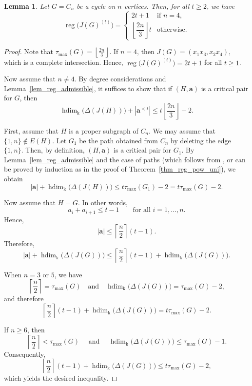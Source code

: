 \documentclass[12pt,amscd]{amsart}
\newtheorem{lem}[thm]{Lemma}
\theoremstyle{definition}
\DeclareMathOperator{\hdim}{hdim}
\DeclareMathOperator{\reg}{reg}
\def\a {\mathbf a}
\def\k {\mathrm k}
\begin{document}
\begin{lem}\label{lem_pow_cycles}
Let $G = C_n$ be a cycle on $n$ vertices. Then, for all $t \ge 2$, we have
\[
\reg\bigl(J(G)^{(t)}\bigr)
=
\begin{cases}
2t + 1 & \text{if } n = 4,\\
\left\lfloor \dfrac{2n}{3} \right\rfloor t & \text{otherwise}.
\end{cases}
\]
\end{lem}

\begin{proof}
Note that
\(\tau_{\max}(G) = \left\lfloor \frac{2n}{3} \right\rfloor.
\) If $n = 4$, then
\(J(G) = (x_1x_3, x_2x_4),
\) which is a complete intersection. Hence,
\(\reg\bigl(J(G)^{(t)}\bigr) = 2t + 1
\) for all $t \ge 1$.

Now assume that $n \neq 4$. By degree considerations and Lemma~\ref{lem_reg_admissible}, it suffices to show that if $(H,\a)$ is a critical pair for $G$, then
\[
\hdim_{\k}\bigl(\Delta(J(H))\bigr) + |\a^{<t}|
\le
t \left\lfloor \frac{2n}{3} \right\rfloor - 2.
\]

First, assume that $H$ is a proper subgraph of $C_n$. We may assume that $\{1,n\} \notin E(H)$. Let $G_1$ be the path obtained from $C_n$ by deleting the edge $\{1,n\}$. Then, by definition, $(H,\a)$ is a critical pair for $G_1$. By Lemma~\ref{lem_reg_admissible} and the case of paths (which follows from \cite{BKK}, or can be proved by induction as in the proof of Theorem~\ref{thm_reg_pow_uni}), we obtain
\[
|\a| + \hdim_{\k}\bigl(\Delta(J(H))\bigr)
\le
t \tau_{\max}(G_1) - 2
=
t \tau_{\max}(G) - 2.
\]

Now assume that $H = G$. In other words,
\[
a_i + a_{i+1} \le t - 1
\qquad
\text{for all } i = 1, \ldots, n.
\]
Hence,
\[
|\a|
\le
\left\lceil \frac{n}{2} \right\rceil (t - 1).
\]
Therefore,
\[
|\a| + \hdim_{\k}\bigl(\Delta(J(G))\bigr)
\le
\left\lceil \frac{n}{2} \right\rceil (t - 1)
+
\hdim_{\k}\bigl(\Delta(J(G))\bigr).
\]

When $n = 3$ or $5$, we have
\[
\left\lceil \frac{n}{2} \right\rceil = \tau_{\max}(G) \quad \text{and} \quad 
\hdim_{\k}\bigl(\Delta(J(G))\bigr) = \tau_{\max}(G) - 2,
\]
and therefore
\[
\left\lceil \frac{n}{2} \right\rceil (t-1)
+
\hdim_{\k}\bigl(\Delta(J(G))\bigr)
=
t\tau_{\max}(G) - 2.
\]

If $n \ge 6$, then
\[
\left\lceil \frac{n}{2} \right\rceil < \tau_{\max}(G) \quad \text{ and } \quad 
\hdim_{\k}\bigl(\Delta(J(G))\bigr)
\le
\tau_{\max}(G) - 1.
\]
Consequently,
\[
\left\lceil \frac{n}{2} \right\rceil (t-1)
+
\hdim_{\k}\bigl(\Delta(J(G))\bigr)
\le
t\tau_{\max}(G) - 2,
\]
which yields the desired inequality.
\end{proof}
\end{document}
